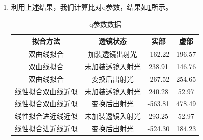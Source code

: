 \begin{enumerate}
\begin{enumerate}
		\item 利用上述结果，我们计算比对q参数，结果如\cref{tab:exp4-q}所示。
		
		\begin{table}[h!]
			\centering
			\caption{q参数数据}
			\label{tab:exp4-q}
			\begin{tabular}{|c|c|c|c|}
				\hline
				\textbf{拟合方法} & \textbf{透镜状态} & \textbf{实部} & \textbf{虚部} \\ \hline
				双曲线拟合 & 加装透镜出射光 & -162.22 & 196.57 \\ \hline
				双曲线拟合 & 未加装透镜入射光 & 238.91 & 146.76 \\ \hline
				双曲线拟合 & 变换后出射光 & -267.52 & 254.65 \\ \hline
				线性拟合双曲线近似 & 未加装透镜入射光 & 240.28 & 52.97 \\ \hline
				线性拟合双曲线近似 & 变换后出射光 & -563.81 & 478.49 \\ \hline
				线性拟合进近线近似 & 未加装透镜入射光 & 293.25 & 52.97 \\ \hline
				线性拟合进近线近似 & 变换后出射光 & -524.30 & 184.23 \\ \hline
			\end{tabular}
		\end{table}
		
	\end{enumerate}
	
\end{enumerate}

